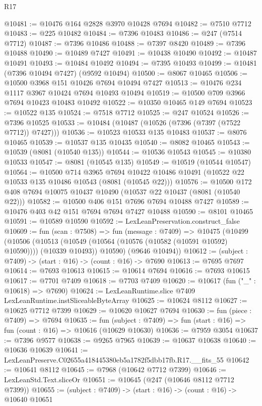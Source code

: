 \begin{lexlean}{R17}
\begin{coremodule}
@10481 := @10476 @164 @2828 @3970 @10428 @7694
@10482 := @7510 @7712
@10483 := @225 @10482
@10484 := @7396 @10483
@10486 := @247 (@7514 @7712)
@10487 := @7396 @10486
@10488 := @7397 @8420
@10489 := @7396 @10488
@10490 := @10489 @7427
@10491 := @10438 @10490
@10492 := @10487 @10491
@10493 := @10484 @10492
@10494 := @7395 @10493
@10499 := @10481 (@7396 @10494 @7427) (@9592 @10494)
@10500 := @8067 @10465
@10506 := @10500 @3968 @151 @10426 @7694 @10494 @7427
@10513 := @10476 @234 @1117 @3967 @10424 @7694 @10493 @10494
@10519 := @10500 @709 @3966 @7694 @10423 @10483 @10492
@10522 := @10350 @10465 @149 @7694
@10523 := @10522 @135
@10524 := @7518 @7712
@10525 := @247 @10524
@10526 := @7396 @10525
@10533 := @10484 (@10487 (@10526 (@7396 (@7397 (@7522 @7712)) @7427)))
@10536 := @10523 @10533 @135 @10483
@10537 := @8076 @10465
@10539 := @10537 @135 @10435
@10540 := @8082 @10465
@10543 := @10539 (@8081 (@10540 @135))
@10544 := @10536 @10543
@10545 := @10380 @10533
@10547 := @8081 (@10545 @135)
@10549 := @10519 (@10544 @10547)
@10564 := @10500
    @714
    @3965
    @7694
    @10422
    @10486
    @10491
    (@10522 @22 @10533 @135 @10486 @10543 (@8081 (@10545 @22)))
@10576 := @10500 @172 @408 @7694 @10075 @10437 @10490 (@10537 @22 @10437 (@8081 (@10540 @22)))
@10582 := @10500 @406 @151 @7696 @7694 @10488 @7427
@10589 := @10476 @403 @42 @151 @7694 @7694 @7427 @10488
@10590 := @8101 @10465
@10591 := @10589 @10590
@10592 := LexLeanPreservation.construct_false
@10609 := fun (scan : @7508) =>
  fun (message : @7409) =>
  @10475
    (@10499
      (@10506
        (@10513 (@10549 (@10564 (@10576 (@10582 (@10591 @10592) @10590)))) (@10339 @10493))
        @10590)
      (@9646 @10494))
@10612 := (subject : @7409) -> (start : @16) -> (count : @16) -> @7690
@10613 := @7695 @7697
@10614 := @7693 @10613
@10615 := @10614 @7694
@10616 := @7693 @10615
@10617 := @7701 @7409
@10618 := @7703 @7409
@10620 := @10617 (fun ("_" : @10618) => @7690)
@10624 := LexLeanRuntime.slice @7409 LexLeanRuntime.instSliceableByteArray
@10625 := @10624 @8112
@10627 := @10625 @7712 @7399
@10629 := @10620 @10627 @7694
@10630 := fun (piece : @7409) => @7694
@10635 := fun (subject : @7409) => fun (start : @16) => fun (count : @16) => @10616 (@10629 @10630)
@10636 := @7959 @3054
@10637 := @7396 @9577
@10638 := @9265 @7965
@10639 := @10637 @10638
@10640 := @10636 @10639
@10641 := LexLeanPreserve.C02655a418445380eb5a1782f5dbb17fb.R17.__fits_55
@10642 := @10641 @8112
@10645 := @7968 (@10642 @7712 @7399)
@10646 := LexLeanStd.Text.sliceOr
@10651 := @10645 (@247 (@10646 @8112 @7712 @7399))
@10655 := (subject : @7409) -> (start : @16) -> (count : @16) -> @10640 @10651

\end{coremodule}
\end{lexlean}
